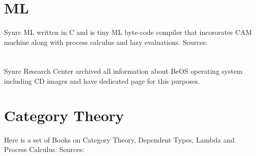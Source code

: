 \documentclass[11pt]{article}
\begin{document}
\section*{ML}
\paragraph{}
Synrc ML written in C and is tiny ML byte-code compiler that incororates CAM machine
along with process calculus and lazy evaluations.
Sources: 

\section*{}
\paragraph{}
Synrc Research Center archived all information about BeOS operating system 
including CD images and have dedicated page for this purposes.

\section*{Category Theory}
\paragraph{}
Here is a set of Books on Category Theory, Dependent Types, Lambda and Process Calculus.
Sources: 


\end{document}
